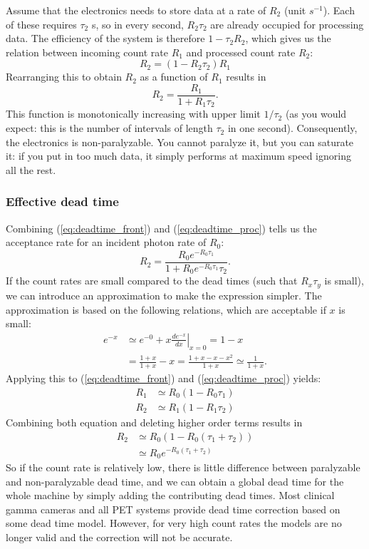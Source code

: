 \documentclass[11pt,oneside]{book}
\begin{document}
Assume that the electronics needs to store data at a rate of $R_2$ (unit
$s^{-1}$). Each of these requires $\tau_2$ s, so in every second, $R_2 \tau_2$
are already occupied for processing data. The efficiency of the system is
therefore $1 - \tau_2 R_2$, which gives us the relation between incoming count
rate $R_1$ and processed count rate $R_2$:
\begin{equation}
  R_2 = (1 - R_2 \tau_2) R_1
\end{equation}
Rearranging this to obtain $R_2$ as a function of $R_1$ results in
\begin{equation}
  R_2 = \frac{R_1}{1 + R_1 \tau_2}. \label{eq:deadtime_proc}
\end{equation}
This function is monotonically increasing with upper limit $1 /
\tau_2$ (as you would expect: this is the number of intervals of
length $\tau_2$ in one second).  Consequently, the electronics is
non-paralyzable. You cannot paralyze it, but you can saturate it: if
you put in too much data, it simply performs at maximum speed ignoring
all the rest.

\subsubsection{Effective dead time}
Combining (\ref{eq:deadtime_front}) and (\ref{eq:deadtime_proc}) tells us the
acceptance rate for an incident photon rate of $R_0$:
\begin{equation}
  R_2 = \frac{R_0 e^{-R_0 \tau_1}}{ 1 + R_0 e^{-R_0 \tau_1} \tau_2}.
\end{equation}
If the count rates are small compared to the dead times (such that $R_x
\tau_y$ is small), we can introduce an approximation to make the
expression simpler. The approximation is based on the following relations,
which are acceptable if $x$ is small:
\begin{align}
  e^{-x} &\simeq e^{-0} + x \left. \frac{d e^{-x}}{dx} \right|_{x=0}= 1-x\\
         &= \frac{1+x}{1+x} - x = \frac{1+x-x-x^2}{1+x} 
        \simeq \frac{1}{1 + x}.
\end{align}
Applying this to (\ref{eq:deadtime_front}) and (\ref{eq:deadtime_proc}) yields:
\begin{align}
  R_1 &\simeq R_0 (1 - R_0 \tau_1)\\
  R_2 &\simeq R_1 (1 - R_1 \tau_2)
\end{align}
Combining both equation and deleting higher order terms results in
\begin{align}
  R_2 &\simeq R_0 \left(1 - R_0 (\tau_1 + \tau_2) \right) \label{eq:dead1}\\
      &\simeq R_0 e^{- R_0 (\tau_1 + \tau_2)} \label{eq:dead2}
\end{align}
So if the count rate is relatively low, there is little difference between
paralyzable and non-paralyzable dead time, and we can obtain a global dead
time for the whole machine by simply adding the contributing dead times.  Most
clinical gamma cameras and all PET systems provide dead time correction based
on some dead time model. However, for very high count rates the models are no
longer valid and the correction will not be accurate.
\end{document}
